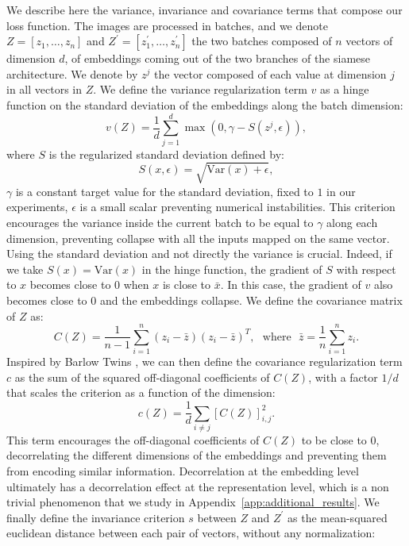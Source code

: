 \documentclass{article}
\begin{document}
We describe here the variance, invariance and covariance terms that compose our loss function. The images are processed in batches, and we denote $Z = [z_1, \dots, z_n]$ and $Z^{\prime} = [z_1^{\prime}, \dots, z_n^{\prime}]$ the two batches composed of $n$ vectors of dimension $d$, of embeddings coming out of the two branches of the siamese architecture. We denote by $z^{j}$ the vector composed of each value at dimension $j$ in all vectors in $Z$. We define the variance regularization term $v$ as a hinge function on the standard deviation of the embeddings along the batch dimension:
\begin{equation} \label{eq:var_loss}
    v(Z) = \frac{1}{d} \sum_{j=1}^{d} \max(0, \gamma - S(z^{j}, \epsilon)),
\end{equation}
where $S$ is the regularized standard deviation defined by:
\begin{equation}
    S(x, \epsilon) = \sqrt{\mathrm{Var}(x) + \epsilon},
\end{equation}
$\gamma$ is a constant target value for the standard deviation, fixed to $1$ in our experiments, $\epsilon$ is a small scalar preventing numerical instabilities. This criterion encourages the variance inside the current batch to be equal to $\gamma$ along each dimension, preventing collapse with all the inputs mapped on the same vector. Using the standard deviation and not directly the variance is crucial. Indeed, if we take $S(x) = \mathrm{Var}(x)$ in the hinge function, the gradient of $S$ with respect to $x$ becomes close to 0 when $x$ is close to $\bar{x}$. In this case, the gradient of $v$ also becomes close to 0 and the embeddings collapse. We define the covariance matrix of $Z$ as:
\begin{equation} \label{eq:covariance}
    C(Z) = \frac{1}{n - 1} \sum_{i=1}^{n} (z_{i} - \bar{z})(z_{i} - \bar{z})^{T}, \ \ \ \textrm{where} \ \ \ \bar{z} = \frac{1}{n} \sum_{i=1}^{n} z_{i}.
\end{equation}
Inspired by Barlow Twins \cite{zbontar2021barlow}, we can then define the covariance regularization term $c$ as the sum of the squared off-diagonal coefficients of $C(Z)$, with a factor $1/d$ that scales the criterion as a function of the dimension:
\begin{equation} \label{eq:cov_loss}
    c(Z) = \frac{1}{d} \sum_{i \ne j} [C(Z)]_{i,j}^2.
\end{equation}
This term encourages the off-diagonal coefficients of $C(Z)$ to be close to $0$, decorrelating the different dimensions of the embeddings and preventing them from encoding similar information. Decorrelation at the embedding level ultimately has a decorrelation effect at the representation level, which is a non trivial phenomenon that we study in Appendix~\ref{app:additional_results}. We finally define the invariance criterion $s$ between $Z$ and $Z^{\prime}$ as the mean-squared euclidean distance between each pair of vectors, without any normalization:
\end{document}

